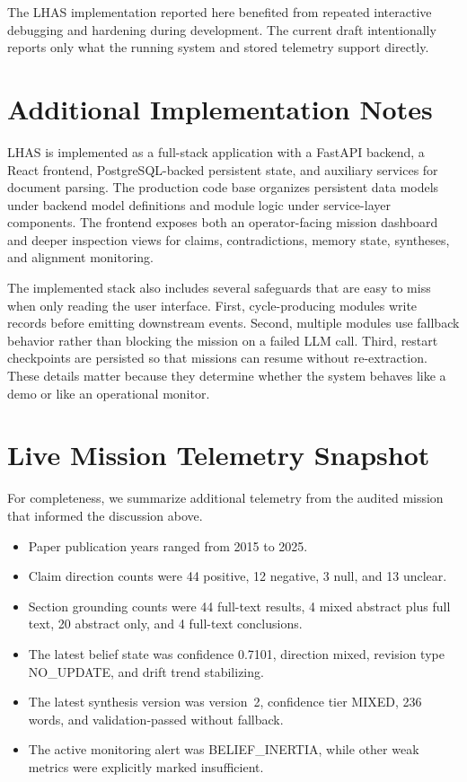 \documentclass[manuscript,screen,review]{jair}
\begin{document}
\begin{acks}
The LHAS implementation reported here benefited from repeated interactive debugging and hardening during development. The current draft intentionally reports only what the running system and stored telemetry support directly.
\end{acks}

\printbibliography

\appendix

\section{Additional Implementation Notes}
LHAS is implemented as a full-stack application with a FastAPI backend, a React frontend, PostgreSQL-backed persistent state, and auxiliary services for document parsing. The production code base organizes persistent data models under backend model definitions and module logic under service-layer components. The frontend exposes both an operator-facing mission dashboard and deeper inspection views for claims, contradictions, memory state, syntheses, and alignment monitoring.

The implemented stack also includes several safeguards that are easy to miss when only reading the user interface. First, cycle-producing modules write records before emitting downstream events. Second, multiple modules use fallback behavior rather than blocking the mission on a failed LLM call. Third, restart checkpoints are persisted so that missions can resume without re-extraction. These details matter because they determine whether the system behaves like a demo or like an operational monitor.

\section{Live Mission Telemetry Snapshot}
For completeness, we summarize additional telemetry from the audited mission that informed the discussion above.

\begin{itemize}[leftmargin=1.5em]
  \item Paper publication years ranged from 2015 to 2025.
  \item Claim direction counts were 44 positive, 12 negative, 3 null, and 13 unclear.
  \item Section grounding counts were 44 full-text results, 4 mixed abstract plus full text, 20 abstract only, and 4 full-text conclusions.
  \item The latest belief state was confidence 0.7101, direction mixed, revision type NO\_UPDATE, and drift trend stabilizing.
  \item The latest synthesis version was version~2, confidence tier MIXED, 236 words, and validation-passed without fallback.
  \item The active monitoring alert was BELIEF\_INERTIA, while other weak metrics were explicitly marked insufficient.
\end{itemize}
\end{document}
